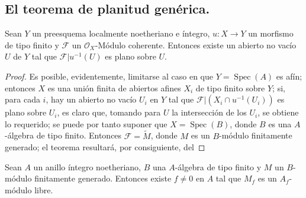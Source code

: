 \subsection{El teorema de planitud genérica.}
\label{subsection:IV.6.9}

\begin{theorem}[6.9.1]
\label{IV.2.s6.9.1-fr}
Sean $Y$ un preesquema localmente noetheriano e íntegro, $u:X\to Y$ un
morfismo de tipo finito y $\mathcal F$ un $\mathcal O_X$-Módulo coherente. Entonces
existe un abierto no vacío $U$ de $Y$ tal que
$\mathcal F|u^{-1}(U)$ es plano sobre $U$.
\end{theorem}

\begin{proof}
Es posible, evidentemente, limitarse al caso en que $Y=\operatorname{Spec}(A)$ es afín;
entonces $X$ es una unión finita de abiertos afines $X_i$ de tipo finito sobre $Y$; si,
para cada $i$, hay un abierto no vacío $U_i$ en $Y$ tal que
$\mathcal F|(X_i\cap u^{-1}(U_i))$ es plano sobre $U_i$, es claro que,
tomando para $U$ la intersección de los $U_i$, se obtiene lo requerido; se puede
por tanto suponer que $X=\operatorname{Spec}(B)$, donde $B$ es una $A$-álgebra de
tipo finito. Entonces $\mathcal F=\widetilde M$, donde $M$ es un $B$-módulo
finitamente generado; el teorema resultará, por consiguiente, del
\end{proof}

\begin{lemma}[6.9.2]
\label{IV.2.s6.9.2-fr}
Sean $A$ un anillo íntegro noetheriano, $B$ una $A$-álgebra de tipo finito y
$M$ un $B$-módulo finitamente generado. Entonces existe $f\ne0$ en $A$ tal que
$M_f$ es un $A_f$-módulo libre.
\end{lemma}

